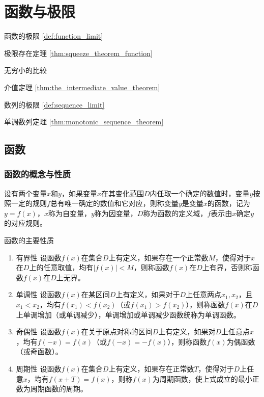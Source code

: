\chapter{函数与极限}

\begin{introduction}
    \item 函数的极限 \ref{def:function_limit}
    \item 极限存在定理 \ref{thm:squeeze_theorem_function}
    \item 无穷小的比较
    \item 介值定理 \ref{thm:the_intermediate_value_theorem}
    \item 数列的极限 \ref{def:sequence_limit}
    \item 单调数列定理 \ref{thm:monotonic_sequence_theorem}
\end{introduction}

\section{函数}
\subsection{函数的概念与性质}
设有两个变量$x$和$y$，如果变量$x$在其变化范围$D$内任取一个确定的数值时，变量$y$按照一定的规则$f$总有唯一确定的数值和它对应，则称变量$y$是变量$x$的函数，记为$y=f(x)$，$x$称为自变量，$y$称为因变量，$D$称为函数的定义域，$f$表示由$x$确定$y$的对应规则。

\begin{property} 函数的主要性质 \label{property:function}
\begin{enumerate}
\item 有界性 \quad 设函数$f(x)$在集合$D$上有定义，如果存在一个正常数$M$，使得对于$x$在$D$上的任意取值，均有$\left| f(x) \right|< M$，则称函数$f(x)$在$D$上有界，否则称函数$f(x)$在$D$上无界。

\item 单调性 \quad 设函数$f(x)$在某区间$D$上有定义，如果对于$D$上任意两点$x_1,x_2$，且$x_1< x_2$，均有$f(x_1)< f(x_2)$（或$f(x_1)> f(x_2)$），则称函数$f(x)$在$D$上单调增加（或单调减少），单调增加或单调减少函数统称为单调函数。

\item 奇偶性 \quad 设函数$f(x)$在关于原点对称的区间$D$上有定义，如果对$D$上任意点$x$，均有$f(-x)=f(x)$（或$f(-x)=-f(x)$），则称函数$f(x)$为偶函数（或奇函数）。

\item 周期性 \quad 设函数$f(x)$在集合$D$上有定义，如果存在正常数$T$，使得对于$D$上任意$x$，均有$f(x+T)=f(x)$，则称$f(x)$为周期函数，使上式成立的最小正数为周期函数的周期。
\end{enumerate}
\end{property}

